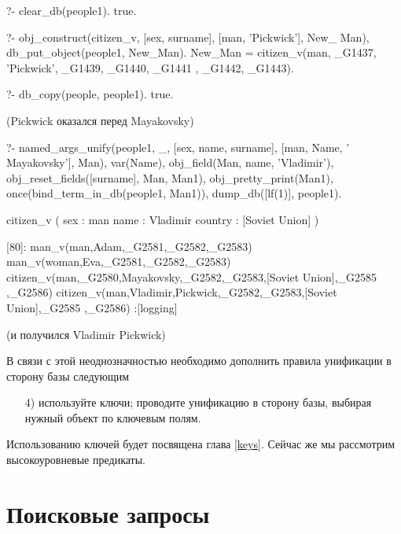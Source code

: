 \documentclass[a4paper]{book}
\begin{document}
\begin{example}{}{}
?- clear_db(people1).
true.

?- obj_construct(citizen_v, [sex, surname], [man, 'Pickwick'], New_
Man), db_put_object(people1, New_Man).
New_Man = citizen_v(man, _G1437, 'Pickwick', _G1439, _G1440, _G1441
, _G1442, _G1443).                                                

?- db_copy(people, people1).
true.
\end{example}

(Pickwick оказался перед Mayakovsky)

\begin{example}{}{}
?- named_args_unify(people1, _, 
      [sex, name, surname], [man, Name, ' Mayakovsky'], Man), 
   var(Name), 
   obj_field(Man, name, 'Vladimir'), 
   obj_reset_fields([surname], Man, Man1), 
   obj_pretty_print(Man1), 
   once(bind_term_in_db(people1, Man1)), 
   dump_db([lf(1)], people1).

citizen_v ( 
  sex : man 
  name : Vladimir 
  country : [Soviet Union] 
) 

[80]: man_v(man,Adam,_G2581,_G2582,_G2583) 
man_v(woman,Eva,_G2581,_G2582,_G2583) 
citizen_v(man,_G2580,Mayakovsky,_G2582,_G2583,[Soviet Union],_G2585
,_G2586)                                                          
citizen_v(man,Vladimir,Pickwick,_G2582,_G2583,[Soviet Union],_G2585
,_G2586)                                                          
 :[logging]
\end{example}

(и получился Vladimir Pickwick)

В связи с этой неоднозначностью необходимо дополнить правила
унификации в сторону базы следующим

\begin{itemize}
\item[4)] используйте ключи; проводите унификацию в сторону базы,
  выбирая нужный объект по ключевым полям.
\end{itemize}

Использованию ключей будет посвящена глава \ref{keys}. Сейчас же
мы рассмотрим высокоуровневые предикаты. 

\section{Поисковые запросы}
\end{document}
